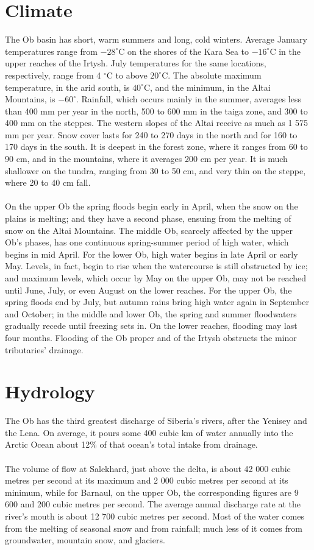 \section{Climate}
The Ob basin has short, warm summers and long, cold winters. Average January temperatures range from  $-28 ^{\circ}$C on the shores of the Kara Sea to $-16 ^{\circ}$C in the upper reaches of the Irtysh. July temperatures for the same locations, respectively, range from 4 $^{\circ}$C to above $20 ^{\circ}$C. The absolute maximum temperature, in the arid south, is $40 ^{\circ}$C,\cite{Obriver} and the minimum, in the Altai Mountains, is $-60 ^{\circ}$. Rainfall, which occurs mainly in the summer, averages less than 400 mm per year in the north, 500 to 600 mm in the taiga zone, and 300 to 400 mm on the steppes. The western slopes of the Altai receive as much as 1 575 mm per year. Snow cover lasts for 240 to 270 days in the north and for 160 to 170 days in the south. It is deepest in the forest zone, where it ranges from 60 to 90 cm, and in the mountains, where it averages 200 cm per year. It is much shallower on the tundra, ranging from 30 to 50 cm, and very thin on the steppe, where 20 to 40 cm fall.\cite{Obriver}\\\\
On the upper Ob the spring floods begin early in April, when the snow on the plains is melting; and they have a second phase, ensuing from the melting of snow on the Altai Mountains. The middle Ob, scarcely affected by the upper Ob's phases, has one continuous spring-summer period of high water, which begins in mid April. For the lower Ob, high water begins in late April or early May. Levels, in fact, begin to rise when the watercourse is still obstructed by ice; and maximum levels, which occur by May on the upper Ob, may not be reached until June, July, or even August on the lower reaches. For the upper Ob, the spring floods end by July, but autumn rains bring high water again in September and October; in the middle and lower Ob, the spring and summer floodwaters gradually recede until freezing sets in. On the lower reaches, flooding may last four months. Flooding of the Ob proper and of the Irtysh obstructs the minor tributaries' drainage.
\section{Hydrology}
The Ob has the third greatest discharge of Siberia's rivers, after the Yenisey and the Lena. On average, it pours some 400 cubic km of water annually into the Arctic Ocean about 12\% of that ocean's total intake from drainage.\\\\
The volume of flow at Salekhard, just above the delta, is about 42 000 cubic metres per second at its maximum and 2 000 cubic metres per second at its minimum, while for Barnaul, on the upper Ob, the corresponding figures are 9 600 and 200 cubic metres per second. The average annual discharge rate at the river's mouth is about 12 700 cubic metres per second. Most of the water comes from the melting of seasonal snow and from rainfall; much less of it comes from groundwater, mountain snow, and glaciers.\cite{Obriver}
